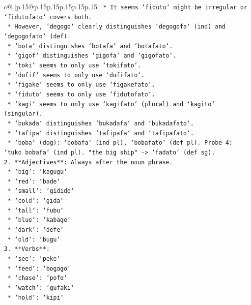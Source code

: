 \documentclass{article}
\begin{document}
{\begin{supertabular}{c@{$\;$}|p{.15\linewidth}@{}p{.15\linewidth}p{.15\linewidth}p{.15\linewidth}p{.15\linewidth}p{.15\linewidth}}
{{{\texttt{        *   It seems `fiduto` might be irregular or `fidutofato` covers both.} \\
\texttt{        *   However, `degogo` clearly distinguishes `degogofa` (ind) and `degogofato` (def).} \\
\texttt{        *   `bota` distinguishes `botafa` and `botafato`.} \\
\texttt{        *   `gigof` distinguishes `gigofa` and `gigofato`.} \\
\texttt{        *   `toki` seems to only use `tokifato`.} \\
\texttt{        *   `dufif` seems to only use `dufifato`.} \\
\texttt{        *   `figake` seems to only use `figakefato`.} \\
\texttt{        *   `fiduto` seems to only use `fidutofato`.} \\
\texttt{        *   `kagi` seems to only use `kagifato` (plural) and `kagito` (singular).} \\
\texttt{        *   `bukada` distinguishes `bukadafa` and `bukadafato`.} \\
\texttt{        *   `tafipa` distinguishes `tafipafa` and `tafipafato`.} \\
\texttt{        *   `boba` (dog): `bobafa` (ind pl), `bobafato` (def pl). Probe 4: `tuko bobafa` (ind pl). "the big ship" {-}> `fadato` (def sg).} \\
\texttt{2.  **Adjectives**: Always after the noun phrase.} \\
\texttt{    *   `big`: `kagugu`} \\
\texttt{    *   `red`: `bade`} \\
\texttt{    *   `small`: `gidido`} \\
\texttt{    *   `cold`: `gida`} \\
\texttt{    *   `tall`: `fubu`} \\
\texttt{    *   `blue`: `kabage`} \\
\texttt{    *   `dark`: `defe`} \\
\texttt{    *   `old`: `bugu`} \\
\texttt{3.  **Verbs**:} \\
\texttt{    *   `see`: `peke`} \\
\texttt{    *   `feed`: `bogago`} \\
\texttt{    *   `chase`: `pofo`} \\
\texttt{    *   `watch`: `gufaki`} \\
\texttt{    *   `hold`: `kipi`} \\
}}}
\end{supertabular}}
\end{document}
